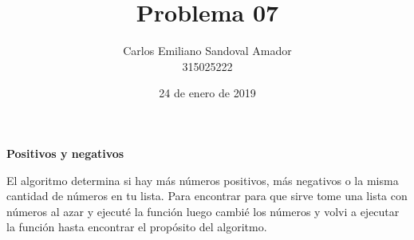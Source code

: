 \documentclass[letterpaper, 12pt, oneside]{article}%
\title{Problema 07}
\author{Carlos Emiliano Sandoval Amador \\ 315025222}
\date{24 de enero de 2019}
\begin{document}
	\maketitle
	\begin{center}
		\textbf{\large Positivos y negativos}
	\end{center}
	El algoritmo determina si hay más números positivos, más negativos o la misma cantidad de números en tu lista. Para encontrar para que sirve tome una lista con números al azar y ejecuté la función luego cambié los números y volvi a ejecutar la función hasta encontrar el propósito del algoritmo.
\end{document}
